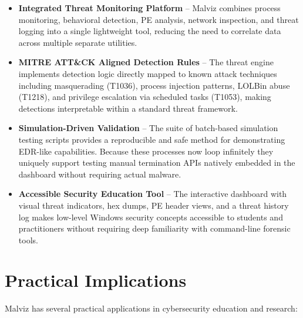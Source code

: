 \begin{itemize}
    \item \textbf{Integrated Threat Monitoring Platform} -- Malviz combines process monitoring, behavioral detection, PE analysis, network inspection, and threat logging into a single lightweight tool, reducing the need to correlate data across multiple separate utilities.

    \item \textbf{MITRE ATT\&CK Aligned Detection Rules} -- The threat engine implements detection logic directly mapped to known attack techniques including masquerading (T1036), process injection patterns, LOLBin abuse (T1218), and privilege escalation via scheduled tasks (T1053), making detections interpretable within a standard threat framework.

    \item \textbf{Simulation-Driven Validation} -- The suite of batch-based simulation testing scripts provides a reproducible and safe method for demonstrating EDR-like capabilities. Because these processes now loop infinitely they uniquely support testing manual termination APIs natively embedded in the dashboard without requiring actual malware.

    \item \textbf{Accessible Security Education Tool} -- The interactive dashboard with visual threat indicators, hex dumps, PE header views, and a threat history log makes low-level Windows security concepts accessible to students and practitioners without requiring deep familiarity with command-line forensic tools.
\end{itemize}

\section{Practical Implications}

Malviz has several practical applications in cybersecurity education and research:


